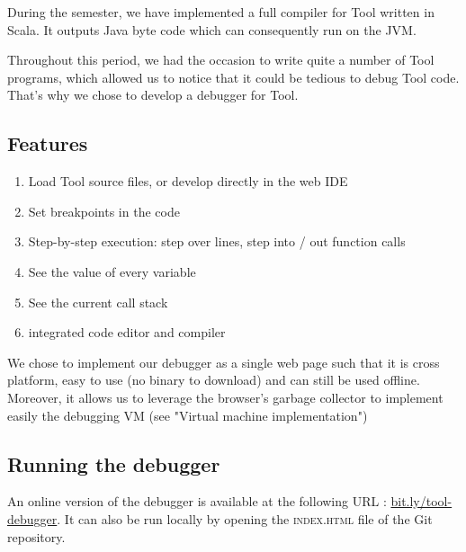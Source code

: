 During the semester, we have implemented a full compiler for Tool written in Scala. It outputs Java byte code which can consequently run on the JVM.

Throughout this period, we had the occasion to write quite a number of Tool programs, which allowed us to notice that it could be tedious to debug Tool code. That's why we chose to develop a debugger for Tool.

\subsection{Features}

\begin{enumerate}
\item Load Tool source files, or develop directly in the web IDE
\item Set breakpoints in the code
\item Step-by-step execution: step over lines, step into / out function calls
\item See the value of every variable
\item See the current call stack
\item integrated code editor and compiler
\end{enumerate}

We chose to implement our debugger as a single web page such that it is cross platform, easy to use (no binary to download) and can still be used offline. Moreover, it allows us to leverage the browser's garbage collector to implement easily the debugging VM (see "Virtual machine implementation")

\subsection{Running the debugger}

An online version of the debugger is available at the following URL : \href{http://bit.ly/tool-debugger}{bit.ly/tool-debugger}. It can also be run locally by opening the \textsc{index.html} file of the Git repository.






